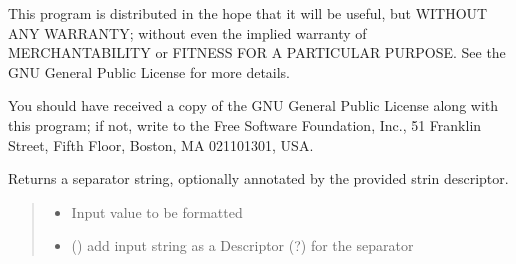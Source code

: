 \documentclass[letterpaper,10pt,english]{sphinxmanual}
\begin{document}
\sphinxAtStartPar
This program is distributed in the hope that it will be useful,
but WITHOUT ANY WARRANTY; without even the implied warranty of
MERCHANTABILITY or FITNESS FOR A PARTICULAR PURPOSE.  See the
GNU General Public License for more details.

\sphinxAtStartPar
You should have received a copy of the GNU General Public License
along with this program; if not, write to the Free Software
Foundation, Inc., 51 Franklin Street, Fifth Floor, Boston, MA  02110\sphinxhyphen{}1301, USA.

\begin{fulllineitems}
\label{\detokenize{api/killMS.Other:killMS.Other.ModColor.Sep}}
\pysigstartsignatures
{}
\pysigstopsignatures
\sphinxAtStartPar
Returns a separator string, optionally annotated by the provided strin descriptor.
\begin{quote}\begin{description}
\begin{itemize}
\item {} 
\sphinxAtStartPar
{} \textendash{} Input value to be formatted

\item {} 
\sphinxAtStartPar
{} () \textendash{} add input string as a Descriptor (?) for the separator

\end{itemize}

\sphinxAtStartPar
{}

\end{description}\end{quote}

\end{fulllineitems}

\end{document}
